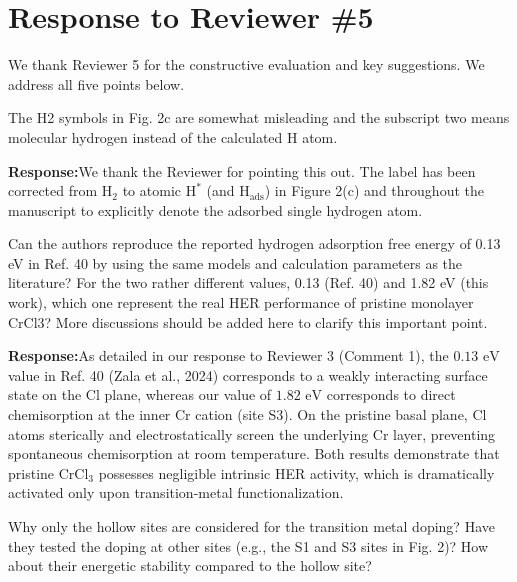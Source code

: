 \documentclass[11pt, sans, a4paper]{moderncv}
\newcommand{\response}{\vspace{0.4em}\noindent\textbf{\color{actionblue}Response:}\hspace{0.5em}}
\begin{document}
\newpage

\section{Response to Reviewer \#5}

\noindent We thank Reviewer 5 for the constructive evaluation and key suggestions. We address all five points below.

\begin{reviewercomment}
The H2 symbols in Fig. 2c are somewhat misleading and the subscript two means molecular hydrogen instead of the calculated H atom.
\end{reviewercomment}

\response We thank the Reviewer for pointing this out. The label has been corrected from $\text{H}_2$ to atomic $\text{H}^*$ (and $\text{H}_{\mathrm{ads}}$) in Figure 2(c) and throughout the manuscript to explicitly denote the adsorbed single hydrogen atom.

\begin{reviewercomment}
Can the authors reproduce the reported hydrogen adsorption free energy of 0.13 eV in Ref. 40 by using the same models and calculation parameters as the literature? For the two rather different values, 0.13 (Ref. 40) and 1.82 eV (this work), which one represent the real HER performance of pristine monolayer CrCl3? More discussions should be added here to clarify this important point.
\end{reviewercomment}

\response As detailed in our response to Reviewer 3 (Comment 1), the $0.13\text{ eV}$ value in Ref. 40 (Zala et al., 2024) corresponds to a weakly interacting surface state on the Cl plane, whereas our value of $1.82\text{ eV}$ corresponds to direct chemisorption at the inner Cr cation (site S3). On the pristine basal plane, Cl atoms sterically and electrostatically screen the underlying Cr layer, preventing spontaneous chemisorption at room temperature. Both results demonstrate that pristine $\text{CrCl}_3$ possesses negligible intrinsic HER activity, which is dramatically activated only upon transition-metal functionalization.

\begin{reviewercomment}
Why only the hollow sites are considered for the transition metal doping? Have they tested the doping at other sites (e.g., the S1 and S3 sites in Fig. 2)? How about their energetic stability compared to the hollow site?
\end{reviewercomment}
\end{document}
